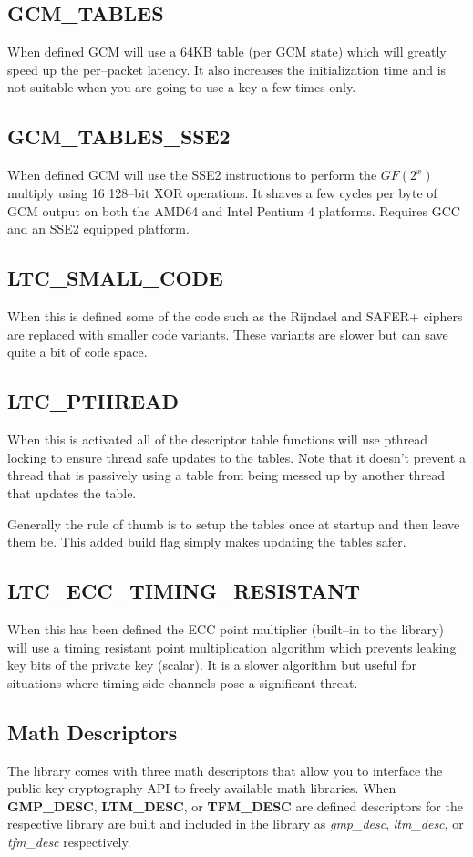 \documentclass[synpaper]{book}
\begin{document}
\subsection{GCM\_TABLES}
When defined GCM will use a 64KB table (per GCM state) which will greatly speed up the per--packet latency.
It also increases the initialization time and is not suitable when you are going to use a key a few times only.

\subsection{GCM\_TABLES\_SSE2}
When defined GCM will use the SSE2 instructions to perform the $GF(2^x)$ multiply using 16 128--bit XOR operations.  It shaves a few cycles per byte
of GCM output on both the AMD64 and Intel Pentium 4 platforms.  Requires GCC and an SSE2 equipped platform.

\subsection{LTC\_SMALL\_CODE}
When this is defined some of the code such as the Rijndael and SAFER+ ciphers are replaced with smaller code variants.
These variants are slower but can save quite a bit of code space.

\subsection{LTC\_PTHREAD}
When this is activated all of the descriptor table functions will use pthread locking to ensure thread safe updates to the tables.  Note that
it doesn't prevent a thread that is passively using a table from being messed up by another thread that updates the table.

Generally the rule of thumb is to setup the tables once at startup and then leave them be.  This added build flag simply makes updating
the tables safer.

\subsection{LTC\_ECC\_TIMING\_RESISTANT}
When this has been defined the ECC point multiplier (built--in to the library) will use a timing resistant point multiplication
algorithm which prevents leaking key bits of the private key (scalar).  It is a slower algorithm but useful for situations
where timing side channels pose a significant threat.

\subsection{Math Descriptors}
The library comes with three math descriptors that allow you to interface the public key cryptography API to freely available math
libraries.  When \textbf{GMP\_DESC}, \textbf{LTM\_DESC}, or \textbf{TFM\_DESC} are defined
descriptors for the respective library are built and included in the library as \textit{gmp\_desc}, \textit{ltm\_desc}, or \textit{tfm\_desc} respectively.
\end{document}
